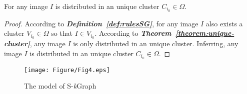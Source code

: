 \documentclass{amcs}
\begin{document}
\begin{theorem}{}
For any image $I$ is distributed in an unique cluster ${C_{{i_0}}}\in \Omega$.
\label{theorem:distribute}
\end{theorem}
\begin{proof}{}
According to \textit{\textbf{Definition~\ref{def:rulesSG}}}, for any image $I$ also exists a cluster ${V_{{i_0}}} \in \Omega $ so that $I \in {V_{{i_0}}}$. According to \textit{\textbf{Theorem~\ref{theorem:unique-cluster}}}, any image $I$ is only distributed in an unique cluster. Inferring, any image $I$ is distributed in an unique cluster ${C_{{i_0}}} \in \Omega $.
\end{proof}
\begin{figure}[!ht]
	\centering
		\texttt{[image: Figure/Fig4.eps]}
		\caption{The model of S-\textit{k}Graph}
		\label{fig:SG}
\end{figure}
\end{document}
